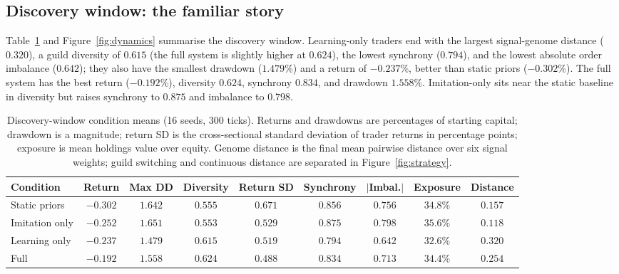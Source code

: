 \documentclass[11pt]{article}
\begin{document}
\subsection{Discovery window: the familiar story}

Table~\ref{tab:discovery} and Figure~\ref{fig:dynamics} summarise the discovery
window. Learning-only traders end with the largest signal-genome distance
($0.320$), a guild diversity of $0.615$ (the full system is slightly higher at
$0.624$), the lowest synchrony ($0.794$), and the lowest absolute order
imbalance ($0.642$); they also have the
smallest drawdown ($1.479\%$) and a return of $-0.237\%$, better than static
priors ($-0.302\%$). The full system has the best return ($-0.192\%$), diversity
$0.624$, synchrony $0.834$, and drawdown $1.558\%$. Imitation-only sits near the
static baseline in diversity but raises synchrony to $0.875$ and imbalance to
$0.798$.

\begin{table}[t]
  \centering
  \small
  \setlength{\tabcolsep}{3pt}
  \caption{Discovery-window condition means (16 seeds, 300 ticks). Returns and
  drawdowns are percentages of starting capital; drawdown is a magnitude; return
  SD is the cross-sectional standard deviation of trader returns in percentage
  points; exposure is mean holdings value over equity. Genome distance is the
  final mean pairwise distance over six signal weights; guild switching and
  continuous distance are separated in Figure~\ref{fig:strategy}.}
  \label{tab:discovery}
  \begin{tabular}{lcccccccc}
    \toprule
    Condition & Return & Max DD & Diversity & Return SD & Synchrony & $|$Imbal.$|$ & Exposure & Distance\\
    \midrule
    Static priors & $-0.302$ & $1.642$ & $0.555$ & $0.671$ & $0.856$ & $0.756$ & $34.8\%$ & $0.157$\\
    Imitation only & $-0.252$ & $1.651$ & $0.553$ & $0.529$ & $0.875$ & $0.798$ & $35.6\%$ & $0.118$\\
    Learning only & $-0.237$ & $1.479$ & $0.615$ & $0.519$ & $0.794$ & $0.642$ & $32.6\%$ & $0.320$\\
    Full & $-0.192$ & $1.558$ & $0.624$ & $0.488$ & $0.834$ & $0.713$ & $34.4\%$ & $0.254$\\
    \bottomrule
  \end{tabular}
\end{table}
\end{document}
